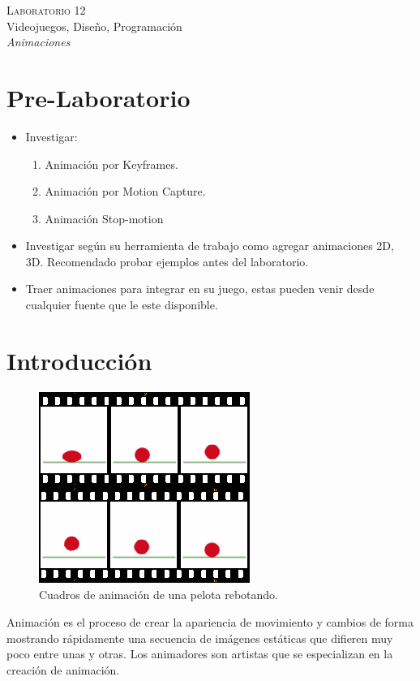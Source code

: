 \begin{center}
\textsc{\Large Laboratorio 12}~\\
{\large Videojuegos, Diseño, Programación}~\\
\emph{Animaciones}
\end{center}

\section{Pre-Laboratorio}
\begin{itemize}
\item Investigar:
\begin{enumerate}
\item Animación por Keyframes.
\item Animación por Motion Capture.
\item Animación Stop-motion
\end{enumerate}
\item Investigar según su herramienta de trabajo como agregar animaciones 2D, 3D. Recomendado probar ejemplos antes del laboratorio.
\item Traer animaciones para integrar en su juego, estas pueden venir desde cualquier fuente que le este disponible.
\end{itemize}

\section{Introducción}
\setlength\intextsep{0pt}
\begin{figure}
\includegraphics[width=\linewidth]{media/anim_frames.png}
\caption{Cuadros de animación de una pelota rebotando.}
\label{fig:particles}
\end{figure}
Animación es el proceso de crear la apariencia de movimiento y cambios de forma mostrando rápidamente una secuencia de imágenes estáticas que difieren muy poco entre unas y otras. Los animadores son artistas que se especializan en la creación de animación.

